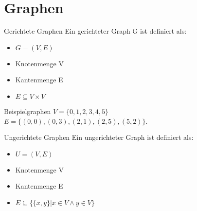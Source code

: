 \section{Graphen}

\begin{frame}{Gerichtete Graphen}
  Ein gerichteter Graph G ist definiert als:
  \begin{itemize}
    \item $G=(V,E)$
    \item Knotenmenge V
    \item Kantenmenge E
    \item $E\subseteq V\times V$
  \end{itemize}
\end{frame}


\begin{frame}{Beispielgraphen}
  $V= \lbrace 0,1,2,3,4,5\rbrace $\\ $E = \lbrace (0,0),(0,3),(2,1),(2,5),(5,2)\rbrace$.
  \begin{center}
  \end{center}
\end{frame}

\begin{frame}{Ungerichtete Graphen}
  Ein ungerichteter Graph ist definiert als:
  \begin{itemize}
    \item $U=(V,E)$
    \item Knotenmenge V
    \item Kantenmenge E
    \item $E\subseteq \{\{x,y\} | x\in V \land y \in V\}$
  \end{itemize}
\end{frame}

